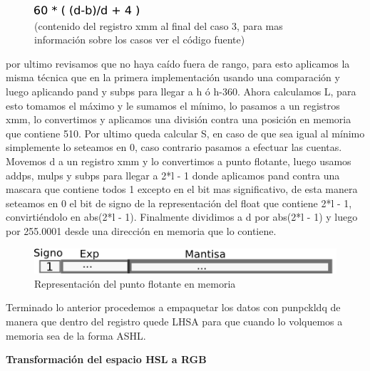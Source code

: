 \documentclass[a4paper]{article}
\begin{document}
\begin{figure}[H]
\centering
\includegraphics[scale=0.8]{imagenes/resultH.png}
\caption{(contenido del registro xmm al final del caso 3, para mas información sobre los casos ver el código fuente)}
\label{lshValue}
\end{figure}

 por ultimo revisamos que no haya caído fuera de rango, para esto aplicamos la misma técnica que en la primera implementación usando una comparación y luego aplicando pand y subps para llegar a h ó h-360.
 \newline
Ahora calculamos L, para esto tomamos el máximo y le sumamos el mínimo, lo pasamos a un registros xmm, lo convertimos y aplicamos una división contra una posición en memoria que contiene 510.
\newline
Por ultimo queda calcular S, en caso de que sea igual al mínimo simplemente lo seteamos en 0, caso contrario pasamos a efectuar las cuentas. Movemos d a un registro xmm y lo convertimos a punto flotante, luego usamos addps, mulps y subps para llegar a 2*l - 1 donde aplicamos pand contra una mascara que contiene todos 1 excepto en el bit mas significativo, de esta manera seteamos en 0 el bit de signo de la representación del float que contiene 2*l - 1, convirtiéndolo en abs(2*l - 1). Finalmente dividimos a d por abs(2*l - 1) y luego por 255.0001 desde una dirección en memoria que lo contiene.
\newline

\begin{figure}[H]
\centering
\includegraphics[scale=0.8]{imagenes/representacionfloat.png}
\caption{Representación del punto flotante en memoria}
\label{lshValue2}
\end{figure}

Terminado lo anterior procedemos a empaquetar los datos con punpckldq de manera que dentro del registro quede LHSA para que cuando lo volquemos a memoria sea de la forma ASHL.
\newline\newline

\textbf{Transformación del espacio HSL a RGB}
\newline\newline
\end{document}
